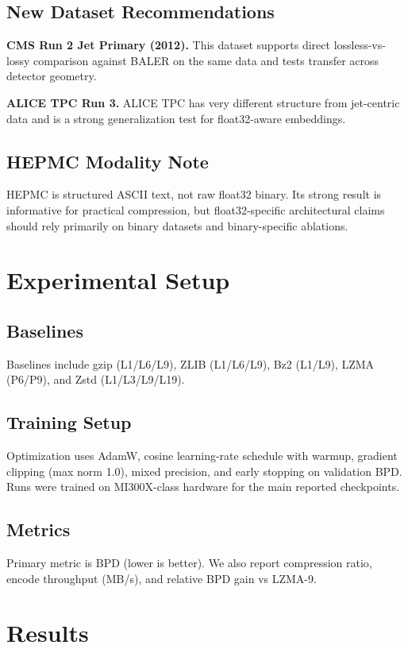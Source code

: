 \documentclass[10pt,twocolumn]{article}
\begin{document}
\subsection{New Dataset Recommendations}
\textbf{CMS Run 2 Jet Primary (2012).} This dataset supports direct lossless-vs-lossy comparison against BALER on the same data and tests transfer across detector geometry.

\textbf{ALICE TPC Run 3.} ALICE TPC has very different structure from jet-centric data and is a strong generalization test for float32-aware embeddings.

\subsection{HEPMC Modality Note}
HEPMC is structured ASCII text, not raw float32 binary. Its strong result is informative for practical compression, but float32-specific architectural claims should rely primarily on binary datasets and binary-specific ablations.

\section{Experimental Setup}
\subsection{Baselines}
Baselines include gzip (L1/L6/L9), ZLIB (L1/L6/L9), Bz2 (L1/L9), LZMA (P6/P9), and Zstd (L1/L3/L9/L19).

\subsection{Training Setup}
Optimization uses AdamW, cosine learning-rate schedule with warmup, gradient clipping (max norm 1.0), mixed precision, and early stopping on validation BPD. Runs were trained on MI300X-class hardware for the main reported checkpoints.

\subsection{Metrics}
Primary metric is BPD (lower is better). We also report compression ratio, encode throughput (MB/s), and relative BPD gain vs LZMA-9.

\section{Results}
\end{document}
